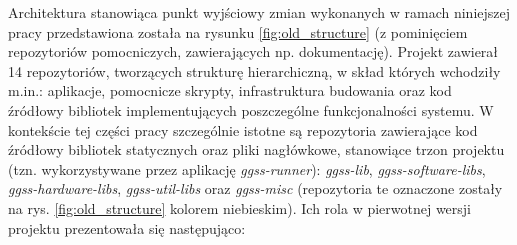Architektura stanowiąca punkt wyjściowy zmian wykonanych w ramach niniejszej pracy przedstawiona została na rysunku \ref{fig:old_structure} (z pominięciem repozytoriów pomocniczych, zawierających np. dokumentację). Projekt zawierał 14 repozytoriów, tworzących strukturę hierarchiczną, w skład których wchodziły m.in.: aplikacje, pomocnicze skrypty, infrastruktura budowania oraz kod źródłowy bibliotek implementujących poszczególne funkcjonalności systemu. W kontekście tej części pracy szczególnie istotne są repozytoria zawierające kod źródłowy bibliotek statycznych oraz pliki nagłówkowe, stanowiące trzon projektu (tzn. wykorzystywane przez aplikację \emph{ggss-runner}): \emph{ggss-lib}, \emph{ggss-software-libs}, \emph{ggss-hardware-libs}, \emph{ggss-util-libs} oraz \emph{ggss-misc} (repozytoria te oznaczone zostały na rys. \ref{fig:old_structure} kolorem niebieskim). Ich rola w pierwotnej wersji projektu prezentowała się następująco:

